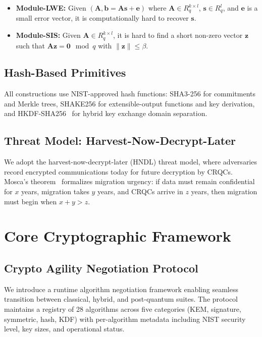 \documentclass[conference,10pt]{IEEEtran}
\newcommand{\shake}{\textsf{SHAKE256}}
\newcommand{\shaiii}{\textsf{SHA3-256}}
\begin{document}
\begin{itemize}
    \item \textbf{Module-LWE:} Given $(\mathbf{A}, \mathbf{b} = \mathbf{A}\mathbf{s} + \mathbf{e})$ where $\mathbf{A} \in R_q^{k \times l}$, $\mathbf{s} \in R_q^l$, and $\mathbf{e}$ is a small error vector, it is computationally hard to recover $\mathbf{s}$.
    \item \textbf{Module-SIS:} Given $\mathbf{A} \in R_q^{k \times l}$, it is hard to find a short non-zero vector $\mathbf{z}$ such that $\mathbf{A}\mathbf{z} = \mathbf{0} \mod q$ with $\|\mathbf{z}\| \leq \beta$.
\end{itemize}

\subsection{Hash-Based Primitives}

All constructions use NIST-approved hash functions: \shaiii{} for commitments and Merkle trees, \shake{} for extensible-output functions and key derivation, and HKDF-SHA256~\cite{rfc5869} for hybrid key exchange domain separation.

\subsection{Threat Model: Harvest-Now-Decrypt-Later}

We adopt the harvest-now-decrypt-later (HNDL) threat model, where adversaries record encrypted communications today for future decryption by CRQCs. Mosca's theorem~\cite{mosca2018} formalizes migration urgency: if data must remain confidential for $x$ years, migration takes $y$ years, and CRQCs arrive in $z$ years, then migration must begin when $x + y > z$.

\section{Core Cryptographic Framework}
\label{sec:core}

\subsection{Crypto Agility Negotiation Protocol}

We introduce a runtime algorithm negotiation framework enabling seamless transition between classical, hybrid, and post-quantum suites. The protocol maintains a registry of 28 algorithms across five categories (KEM, signature, symmetric, hash, KDF) with per-algorithm metadata including NIST security level, key sizes, and operational status.
\end{document}
